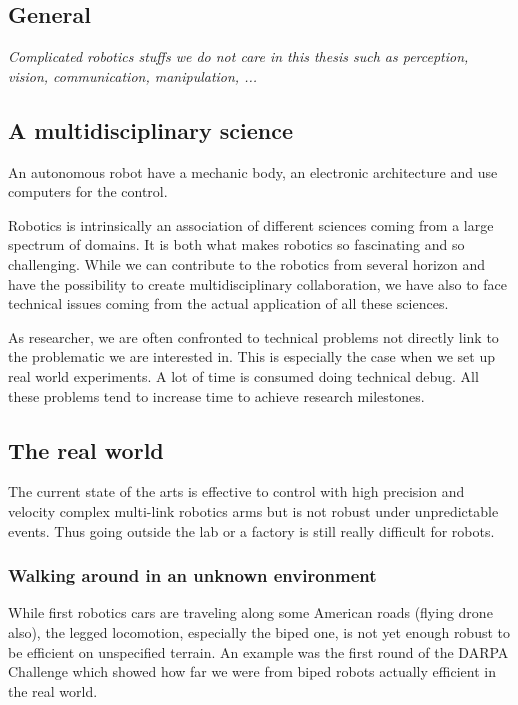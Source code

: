 \subsection{General} %
\emph{Complicated robotics stuffs we do not care in this thesis such as perception, vision, communication, manipulation, ...}

\subsection{A multidisciplinary science} %
An autonomous robot have a mechanic body, an electronic architecture and use computers for the control.

Robotics is intrinsically an association of different sciences coming from a large spectrum of domains.
It is both what makes robotics so fascinating and so challenging.
While we can contribute to the robotics from several horizon and have the possibility to create multidisciplinary collaboration, we have also to face technical issues coming from the actual application of all these sciences.

As researcher, we  are often confronted to technical problems not directly link to the problematic we are interested in.
This is especially the case when we set up real world experiments.
A lot of time is consumed doing technical debug.
All these problems tend to increase time to achieve research milestones.


\subsection{The real world} %

The current state of the arts is effective to control with high precision and velocity complex multi-link robotics arms but is not robust under unpredictable events.
Thus going outside the lab or a factory is still really difficult for robots.

\subsubsection{Walking around in an unknown environment} %
While first robotics cars are traveling along some American roads (flying drone also), the legged locomotion, especially the biped one, is not yet enough robust to be efficient on unspecified terrain.
An example was the first round of the DARPA Challenge which showed how far we were from biped robots actually efficient in the real world.


